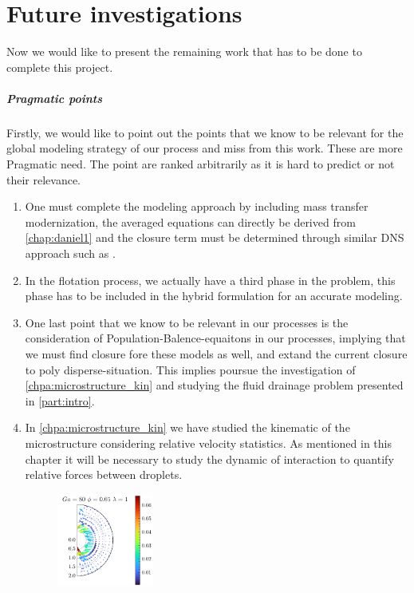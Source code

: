 \chapter*{Future investigations}

Now we would like to present the remaining work that has to be done to complete this project. 


\paragraph*{Pragmatic points}
Firstly,  we would like to point out the points that we know to be relevant for the global modeling strategy of our process and miss from this work.
These are more Pragmatic need.  
The point are ranked arbitrarily as it is hard to predict or not their relevance. 
\begin{enumerate}
    \item One must complete the modeling approach by including mass transfer modernization, the averaged equations can directly be derived from \ref{chap:daniel1} and the closure term must be determined through similar DNS approach such as \citep{hidman2023assessing}. 
    \item In the flotation process, we actually have a third phase in the problem, this phase has to be included in the hybrid formulation for an accurate modeling. 
    \item One last point that we know to be relevant in our processes is the consideration of Population-Balence-equaitons in our processes, implying that we must find closure fore these models as well, and extand the current closure to poly disperse-situation. 
    This implies poursue the investigation of \ref{chpa:microstructure_kin} and studying the fluid drainage problem presented in \ref{part:intro}. 
    \item In \ref{chpa:microstructure_kin} we have studied the kinematic of the microstructure considering relative velocity statistics. 
    As mentioned in this chapter it will be necessary to study the dynamic of interaction to quantify relative forces between droplets. 
    \begin{figure}[h!]
        \centering
        \includegraphics[width=0.3\textwidth]{image/HOMOGENEOUS_final/Dist/F_rel_l_1_Ga_80_PHI_5}

\end{figure}
\end{enumerate}
